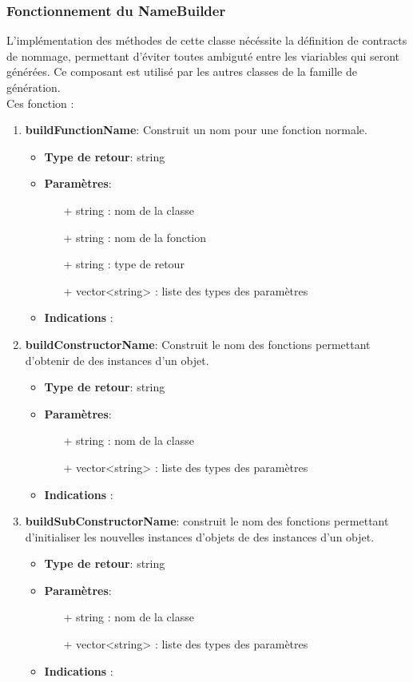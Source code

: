 \documentclass{article}
\begin{document}
   \subsubsection{Fonctionnement du NameBuilder}
   L'implémentation des méthodes de cette classe nécéssite la définition de contracts de nommage, permettant d'éviter toutes ambiguté entre les viariables qui seront générées. Ce composant est utilisé par les autres classes de la famille de génération.\\Ces fonction : \
   \begin{enumerate}
   \item \textbf{buildFunctionName}: Construit un nom pour une fonction normale.
   \begin{itemize}
     \item \textbf{Type de retour}: string
     \item \textbf{Paramètres}:
     \begin{enumerate}
       \item[+] string : nom de la classe
       \item[+] string : nom de la fonction
       \item[+] string : type de retour
       \item[+] vector<string> : liste des types des paramètres
     \end{enumerate}
     \item \textbf{Indications} : 
   \end{itemize}

   \item \textbf{buildConstructorName}: Construit le nom des fonctions permettant d'obtenir de des instances d'un objet.
   \begin{itemize}
     \item \textbf{Type de retour}: string
     \item \textbf{Paramètres}:
     \begin{enumerate}
       \item[+] string : nom de la classe
       \item[+] vector<string> : liste des types des paramètres
     \end{enumerate}
     \item \textbf{Indications} :
   \end{itemize}

   \item \textbf{buildSubConstructorName}: construit le nom des fonctions permettant d'initialiser les nouvelles instances d'objets de des instances d'un objet.
   \begin{itemize}
     \item \textbf{Type de retour}: string
     \item \textbf{Paramètres}:
     \begin{enumerate}
       \item[+] string : nom de la classe
       \item[+] vector<string> : liste des types des paramètres
     \end{enumerate}
     \item \textbf{Indications} :
   \end{itemize}


\end{enumerate}
\end{document}
